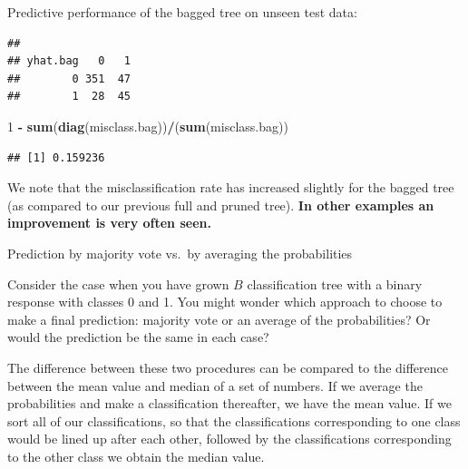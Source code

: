 \documentclass[ignorenonframetext,]{beamer}
\newenvironment{Shaded}{\begin{snugshade}}{\end{snugshade}}
\newcommand{\KeywordTok}[1]{\textcolor[rgb]{0.13,0.29,0.53}{\textbf{#1}}}
\newcommand{\DataTypeTok}[1]{\textcolor[rgb]{0.13,0.29,0.53}{#1}}
\newcommand{\DecValTok}[1]{\textcolor[rgb]{0.00,0.00,0.81}{#1}}
\newcommand{\StringTok}[1]{\textcolor[rgb]{0.31,0.60,0.02}{#1}}
\newcommand{\OperatorTok}[1]{\textcolor[rgb]{0.81,0.36,0.00}{\textbf{#1}}}
\newcommand{\NormalTok}[1]{#1}
\begin{document}
\begin{frame}[fragile]

Predictive performance of the bagged tree on unseen test data:

\begin{Shaded}
\end{Shaded}

\begin{verbatim}
##         
## yhat.bag   0   1
##        0 351  47
##        1  28  45
\end{verbatim}

\begin{Shaded}
\begin{Highlighting}[]
\DecValTok{1} \OperatorTok{-}\StringTok{ }\KeywordTok{sum}\NormalTok{(}\KeywordTok{diag}\NormalTok{(misclass.bag))}\OperatorTok{/}\NormalTok{(}\KeywordTok{sum}\NormalTok{(misclass.bag))}
\end{Highlighting}
\end{Shaded}

\begin{verbatim}
## [1] 0.159236
\end{verbatim}

We note that the misclassification rate has increased slightly for the
bagged tree (as compared to our previous full and pruned tree).
\textbf{In other examples an improvement is very often seen.}

\end{frame}

\begin{frame}

\begin{block}{Prediction by majority vote vs.~by averaging the
probabilities}

Consider the case when you have grown \(B\) classification tree with a
binary response with classes 0 and 1. You might wonder which approach to
choose to make a final prediction: majority vote or an average of the
probabilities? Or would the prediction be the same in each case?

The difference between these two procedures can be compared to the
difference between the mean value and median of a set of numbers. If we
average the probabilities and make a classification thereafter, we have
the mean value. If we sort all of our classifications, so that the
classifications corresponding to one class would be lined up after each
other, followed by the classifications corresponding to the other class
we obtain the median value.

\end{block}

\end{frame}
\end{document}
